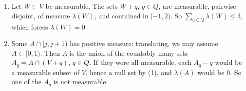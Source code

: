\begin{enumerate}[nosep]
  \item Let $W\subset V$ be measurable. The sets $W + q$, $q\in Q$,
        are measurable, pairwise disjoint, of measure $\lambda(W)$,
        and contained in $[-1, 2)$. So
        $\sum_{q\in Q}\lambda(W)\leq3$, which forces
        $\lambda(W) = 0$.
  \item Some $A\cap[j, j + 1)$ has positive measure; translating, we
        may assume $A\subset[0, 1)$. Then $A$ is the union of the
        countably many sets $A_q = A\cap(V + q)$, $q\in Q$. If they
        were all measurable, each $A_q - q$ would be a measurable
        subset of $V$, hence a null set by (1), and $\lambda(A)$ would
        be $0$. So one of the $A_q$ is not measurable.
\end{enumerate}
